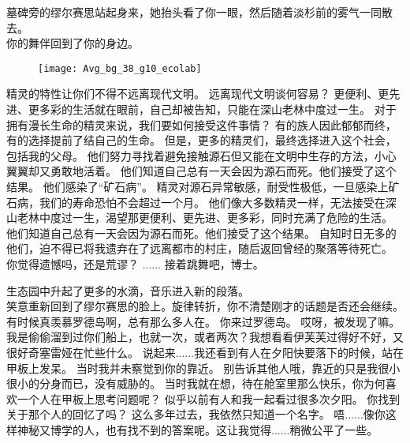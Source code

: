 \documentclass[openany]{book}
\begin{document}
\begin{dialogue}
    墓碑旁的缪尔赛思站起身来，她抬头看了你一眼，然后随着淡杉前的雾气一同散去。\\
    你的舞伴回到了你的身边。\\
    \begin{figure}[h]
        \centering
        \texttt{[image: Avg\_bg\_38\_g10\_ecolab]}
    \end{figure}
     精灵的特性让你们不得不远离现代文明。
     远离现代文明谈何容易？
     更便利、更先进、更多彩的生活就在眼前，自己却被告知，只能在深山老林中度过一生。
     对于拥有漫长生命的精灵来说，我们要如何接受这件事情？
     有的族人因此郁郁而终，有的选择提前了结自己的生命。
     但是，更多的精灵们，最终选择进入这个社会，包括我的父母。
     他们努力寻找着避免接触源石但又能在文明中生存的方法，小心翼翼却又勇敢地活着。
     他们知道自己总有一天会因为源石而死。他们接受了这个结果。
     他们感染了“矿石病”。
     精灵对源石异常敏感，耐受性极低，一旦感染上矿石病，我们的寿命恐怕不会超过一个月。
     他们像大多数精灵一样，无法接受在深山老林中度过一生，渴望那更便利、更先进、更多彩，同时充满了危险的生活。
     他们知道自己总有一天会因为源石而死。他们接受了这个结果。
     自知时日无多的他们，迫不得已将我遗弃在了远离都市的村庄，随后返回曾经的聚落等待死亡。
     你觉得遗憾吗，还是荒谬？
     ......
     接着跳舞吧，博士。\par
    生态园中升起了更多的水滴，音乐进入新的段落。\\
    笑意重新回到了缪尔赛思的脸上。旋律转折，你不清楚刚才的话题是否还会继续。
     有时候真羡慕罗德岛啊，总有那么多人在。
     你来过罗德岛。
     哎呀，被发现了嘛。
     我是偷偷溜到过你们船上，也就一次，或者两次？我想看看伊芙芙过得好不好，又很好奇塞雷娅在忙些什么。
     说起来......我还看到有人在夕阳快要落下的时候，站在甲板上发呆。
     当时我并未察觉到你的靠近。
     别告诉其他人哦，靠近的只是我很小很小的分身而已，没有威胁的。
     当时我就在想，待在舱室里那么快乐，你为何喜欢一个人在甲板上思考问题呢？
     似乎以前有人和我一起看过很多次夕阳。
     你找到关于那个人的回忆了吗？
     这么多年过去，我依然只知道一个名字。
     唔......像你这样神秘又博学的人，也有找不到的答案呢。这让我觉得......稍微公平了一些。\par

\end{dialogue}
\end{document}
